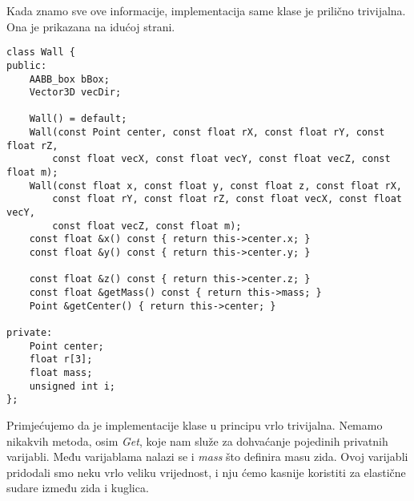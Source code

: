 Kada znamo sve ove informacije, implementacija same klase je prilično trivijalna. Ona je prikazana na idućoj strani.
\newpage
\begin{lstlisting}[style=myC++, label = {code:11}, caption={Implementacija klase Wall}]
class Wall {
public:
	AABB_box bBox;
	Vector3D vecDir;

	Wall() = default;
	Wall(const Point center, const float rX, const float rY, const float rZ,
		const float vecX, const float vecY, const float vecZ, const float m);
	Wall(const float x, const float y, const float z, const float rX,
		const float rY, const float rZ, const float vecX, const float vecY,
		const float vecZ, const float m);
	const float &x() const { return this->center.x; }
	const float &y() const { return this->center.y; }

	const float &z() const { return this->center.z; }
	const float &getMass() const { return this->mass; }
	Point &getCenter() { return this->center; }

private:
	Point center;
	float r[3];
	float mass;
	unsigned int i;
};

\end{lstlisting}
Primjećujemo da je implementacije klase u principu vrlo trivijalna. Nemamo nikakvih metoda, osim \emph{Get}, koje nam služe za dohvaćanje pojedinih privatnih varijabli. Među varijablama nalazi se i \emph{mass} što definira masu zida. Ovoj varijabli pridodali smo neku vrlo veliku vrijednost, i nju ćemo kasnije koristiti za elastične sudare između zida i kuglica. 
